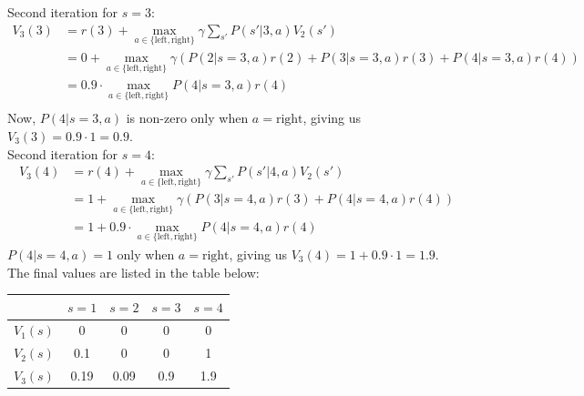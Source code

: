 \documentclass{article}
\begin{document}
\begin{itemize}
    Second iteration for $s = 3$: \\
    \begin{align*}
      V_3(3) &= r(3) + \max_{a \in \{\text{left}, \text{right}\}} \gamma \sum_{s'} P(s' | 3, a) V_2(s') \\
      &= 0 + \max_{a \in \{\text{left}, \text{right}\}} \gamma (P(2|s=3, a)r(2) + P(3|s=3, a)r(3) + P(4|s=3, a)r(4)) \\
      &= 0.9 \cdot \max_{a \in \{\text{left}, \text{right}\}} P(4|s=3, a)r(4) \\
    \end{align*}
    Now, $P(4|s=3, a)$ is non-zero only when $a = \text{right}$, giving us $V_3(3) = 0.9 \cdot 1 = 0.9$. \\
    Second iteration for $s = 4$: \\
    \begin{align*}
      V_3(4) &= r(4) + \max_{a \in \{\text{left}, \text{right}\}} \gamma \sum_{s'} P(s' | 4, a) V_2(s') \\
      &= 1 + \max_{a \in \{\text{left}, \text{right}\}} \gamma (P(3|s=4, a)r(3) + P(4|s=4, a)r(4)) \\
      &= 1 + 0.9 \cdot \max_{a \in \{\text{left}, \text{right}\}} P(4|s=4, a)r(4)
    \end{align*}
    $P(4|s=4, a) = 1$ only when $a = \text{right}$, giving us $V_3(4) = 1 + 0.9 \cdot 1 = 1.9$. \\
    The final values are listed in the table below:
    \begin{table}[h!]
      \centering
      \begin{tabular}{|c|c|c|c|c|}
        \hline
        & $s=1$ & $s=2$ & $s=3$ & $s=4$ \\
        \hline
        $V_1(s)$ & 0 & 0 & 0 & 0 \\
        \hline
        $V_2(s)$ & 0.1 & 0 & 0 & 1 \\
        \hline
        $V_3(s)$ & 0.19 & 0.09 & 0.9 & 1.9 \\
        \hline
      \end{tabular}
    \end{table}


\end{itemize}
\end{document}
